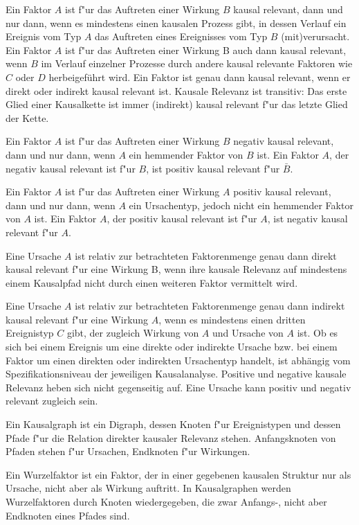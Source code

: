 \documentclass[emulatestandardclasses]{scrartcl}
\begin{document}
\begin{description}[leftmargin=!,labelwidth=\widthof{\bfseries Dialektischer Materialismus}]
  \item[Kausale Relevanz] Ein Faktor $A$ ist f"ur das Auftreten einer Wirkung $B$ kausal relevant, dann und nur dann, wenn es mindestens einen kausalen Prozess gibt, in dessen Verlauf ein Ereignis vom Typ $A$ das Auftreten eines Ereignisses vom Typ $B$ (mit)verursacht. Ein Faktor $A$ ist f"ur das Auftreten einer Wirkung B auch dann kausal relevant, wenn $B$ im Verlauf einzelner Prozesse durch andere kausal relevante Faktoren wie $C$ oder $D$ herbeigeführt wird. Ein Faktor ist genau dann kausal relevant, wenn er direkt oder indirekt kausal relevant ist. Kausale Relevanz ist transitiv: Das erste Glied einer Kausalkette ist immer (indirekt) kausal relevant f"ur das letzte Glied der Kette.
  \item[Negative kausale Relevanz] Ein Faktor $A$ ist f"ur das Auftreten einer Wirkung $B$ negativ kausal relevant, dann und nur dann, wenn $A$ ein hemmender Faktor von $B$ ist. Ein Faktor $A$, der negativ kausal relevant ist f"ur $B$, ist positiv kausal relevant f"ur $\bar{B}$. 
  \item[Positive kausale Relevanz] Ein Faktor $A$ ist f"ur das Auftreten einer Wirkung $A$ positiv kausal relevant, dann und nur dann, wenn $A$ ein Ursachentyp, jedoch nicht ein hemmender Faktor von $A$ ist. Ein Faktor $A$, der positiv kausal relevant ist f"ur $A$, ist negativ kausal relevant f"ur $A$.
  \item[Direkte kausale Relevanz] Eine Ursache $A$ ist relativ zur betrachteten Faktorenmenge genau dann direkt kausal relevant f"ur eine Wirkung B, wenn ihre kausale Relevanz auf mindestens einem Kausalpfad nicht durch einen weiteren Faktor vermittelt wird.
  \item[Indirekte kausale Relevanz] Eine Ursache $A$ ist relativ zur betrachteten Faktorenmenge genau dann indirekt kausal relevant f"ur eine Wirkung $A$, wenn es mindestens einen dritten Ereignistyp $C$ gibt, der zugleich Wirkung von $A$ und Ursache von $A$ ist. Ob es sich bei einem Ereignis um eine direkte oder indirekte Ursache bzw. bei einem Faktor um einen direkten oder indirekten Ursachentyp handelt, ist abhängig vom Spezifikationsniveau der jeweiligen Kausalanalyse. Positive und negative kausale Relevanz heben sich nicht gegenseitig auf. Eine Ursache kann positiv und negativ relevant zugleich sein.
  \item[Kausalgraph] Ein Kausalgraph ist ein Digraph, dessen Knoten f"ur Ereignistypen und dessen Pfade f"ur die Relation direkter kausaler Relevanz stehen. Anfangsknoten von Pfaden stehen f"ur Ursachen, Endknoten f"ur Wirkungen.
  \item[Wurzelfaktor] Ein Wurzelfaktor ist ein Faktor, der in einer gegebenen kausalen Struktur nur als Ursache, nicht aber als Wirkung auftritt. In Kausalgraphen werden Wurzelfaktoren durch Knoten wiedergegeben, die zwar Anfangs-, nicht aber Endknoten eines Pfades sind.
\end{description}
\end{document}
